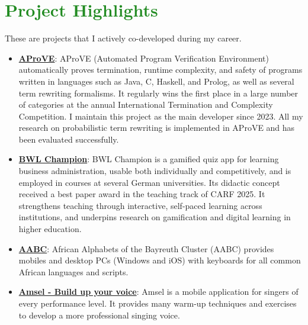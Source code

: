 \documentclass[letterpaper,11pt]{article}
\newcommand{\resumeItem}[2]{
  \item\small{
    \textbf{#1}{: #2 \vspace{-2pt}}
  }
}
\newcommand{\resumeSubItem}[2]{\resumeItem{#1}{#2}\vspace{-4pt}}
\newcommand{\resumeSubHeadingListStart}{\begin{itemize}[leftmargin=*]}
\newcommand{\resumeSubHeadingListEnd}{\end{itemize}}
\begin{document}
\section{\textcolor{ForestGreen}{Project Highlights}}
  {\small These are projects that I actively co-developed during my career.}
  \resumeSubHeadingListStart
    \resumeSubItem{\href{https://aprove.informatik.rwth-aachen.de/}{AProVE}}
      {AProVE (Automated Program Verification Environment) automatically proves termination, runtime complexity, and safety of programs written in languages such as Java, C, Haskell, and Prolog, as well as several term rewriting formalisms. It regularly wins the first place in a large number of categories at the annual International Termination and Complexity Competition. I maintain this project as the main developer since 2023. All my research on probabilistic term rewriting is implemented in AProVE and has been evaluated successfully.}
    \resumeSubItem{\href{https://app-partner.com/}{BWL Champion}}
      {BWL Champion is a gamified quiz app for learning business administration, usable both individually and competitively, and is employed in courses at several German universities. Its didactic concept received a best paper award in the teaching track of CARF 2025. 
      It strengthens teaching through interactive, self-paced learning across institutions, and underpins research on gamification and digital learning in higher education.}
    \resumeSubItem{\href{https://www.africamultiple.uni-bayreuth.de/en/AABC/English-Version/index.html}{AABC}}
      {African Alphabets of the Bayreuth Cluster (AABC) provides mobiles and desktop PCs (Windows and iOS) with keyboards for all common African languages and scripts.}
    \resumeSubItem{\href{https://de.amselapp.com/}{Amsel - Build up your voice}}
      {Amsel is a mobile application for singers of every performance level. It provides many warm-up techniques and exercises to develop a more professional singing voice.}
  \resumeSubHeadingListEnd

\end{document}
